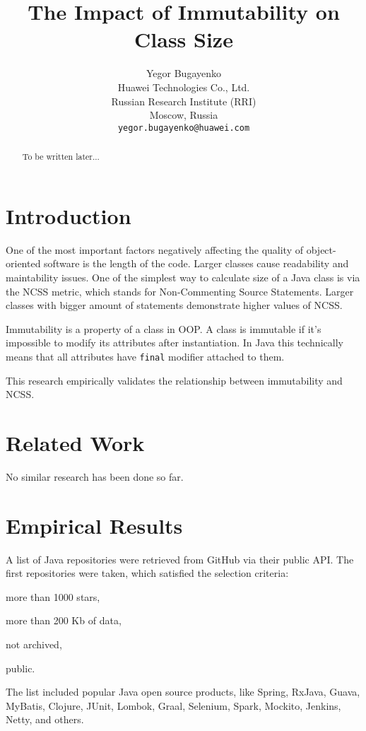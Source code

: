 \documentclass[12pt]{article}
\title{The Impact of Immutability on Class Size}
\author{Yegor Bugayenko\\Huawei Technologies Co., Ltd.\\Russian Research Institute (RRI)\\Moscow, Russia\\\texttt{yegor.bugayenko@huawei.com}}{}{}
\begin{document}
\raggedbottom
\maketitle

\begin{abstract}
To be written later...
\end{abstract}

\section{Introduction}

One of the most important factors negatively affecting the quality
of object-oriented software is the length of the code. Larger classes
cause readability and maintability issues. One of the simplest way
to calculate size of a Java class is via the NCSS metric, which
stands for Non-Commenting Source Statements. Larger classes with bigger
amount of statements demonstrate higher values of NCSS.

Immutability is a property of a class in OOP. A class is immutable if
it's impossible to modify its attributes after instantiation. In Java this
technically means that all attributes have \texttt{final} modifier attached
to them.

This research empirically validates the relationship between immutability
and NCSS.

\section{Related Work}

No similar research has been done so far.

\section{Empirical Results}

A list of Java repositories were retrieved from GitHub via their
public API. The first \totalrepos{} repositories were taken, which satisfied
the selection criteria:
\begin{enumerate*}[label={\arabic*)}]
\item more than 1000 stars,
\item more than 200 Kb of data,
\item not archived,
\item public.
\end{enumerate*}
The list included popular Java open source products, like
Spring, RxJava, Guava, MyBatis, Clojure, JUnit, Lombok,
Graal, Selenium, Spark, Mockito, Jenkins, Netty, and others.
\end{document}
